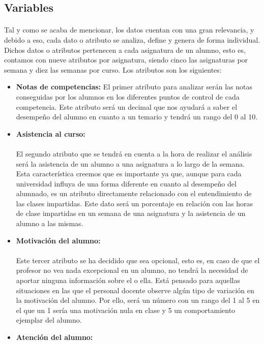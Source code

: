 \subsection{Variables}
\paragraph{}
Tal y como se acaba de mencionar, los datos cuentan con una gran relevancia, y debido a eso, cada dato o atributo se analiza, define y genera de forma individual. Dichos datos o atributos pertenecen a cada asignatura de un alumno, esto es, contamos con nueve atributos por asignatura, siendo cinco las asignaturas por semana y diez las semanas por curso. Los atributos son los siguientes:

\begin{itemize}
\item \textbf{Notas de competencias:} 
El primer atributo para analizar serán las notas conseguidas por los alumnos en los diferentes puntos de control de cada competencia. Este atributo será un decimal que nos ayudará a saber el desempeño del alumno en cuanto a un temario y tendrá un rango del 0 al 10.
\item \textbf{Asistencia al curso:}
\paragraph{}
 El segundo atributo que se tendrá en cuenta a la hora de realizar el análisis será la asistencia de un alumno a una asignatura a lo largo de la semana. Esta característica creemos que es importante ya que, aunque para cada universidad influya de una forma diferente en cuanto al desempeño del alumnado, es un atributo directamente relacionado con el entendimiento de las clases impartidas. Este dato será un porcentaje en relación con las horas de clase impartidas en un semana de una asignatura y la asistencia de un alumno a las mismas.
\item \textbf{Motivación del alumno:}
\paragraph{}
Este tercer atributo se ha decidido que sea opcional, esto es, en caso de que el profesor no vea nada excepcional en un alumno, no tendrá la necesidad de aportar ninguna información sobre el o ella. Está pensado para aquellas situaciones en las que el personal docente observe algún tipo de variación en la motivación del alumno. Por ello, será un número con un rango del 1 al 5 en el que un 1 sería una motivación nula en clase y 5 un comportamiento ejemplar del alumno.
\item \textbf{Atención del alumno:}

\end{itemize}
